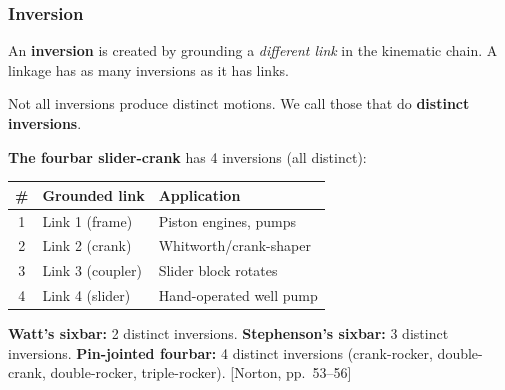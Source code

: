 \documentclass[10pt,aspectratio=43]{beamer}
\newcommand{\pref}[1]{\vfill\hfill{\scriptsize\color{gray}[Norton, pp.~#1]}}
\begin{document}
\begin{frame}
\frametitle{Inversion}

\begin{yellowbox}
An \textbf{inversion} is created by grounding a \emph{different link} in the kinematic chain. A linkage has as many inversions as it has links.
\end{yellowbox}

\vspace{4pt}
Not all inversions produce distinct motions. We call those that do \textbf{distinct inversions}.

\vspace{6pt}
\textbf{The fourbar slider-crank} has 4 inversions (all distinct):

\begin{center}
\small
\begin{tabular}{c|l|l}
\toprule
\textbf{\#} & \textbf{Grounded link} & \textbf{Application} \\
\midrule
1 & Link 1 (frame) & Piston engines, pumps \\
2 & Link 2 (crank) & Whitworth/crank-shaper \\
3 & Link 3 (coupler) & Slider block rotates \\
4 & Link 4 (slider) & Hand-operated well pump \\
\bottomrule
\end{tabular}
\end{center}

\vspace{4pt}
\textbf{Watt's sixbar:} 2 distinct inversions. \textbf{Stephenson's sixbar:} 3 distinct inversions. \textbf{Pin-jointed fourbar:} 4 distinct inversions (crank-rocker, double-crank, double-rocker, triple-rocker).
\pref{53--56}
\end{frame}

\end{document}
